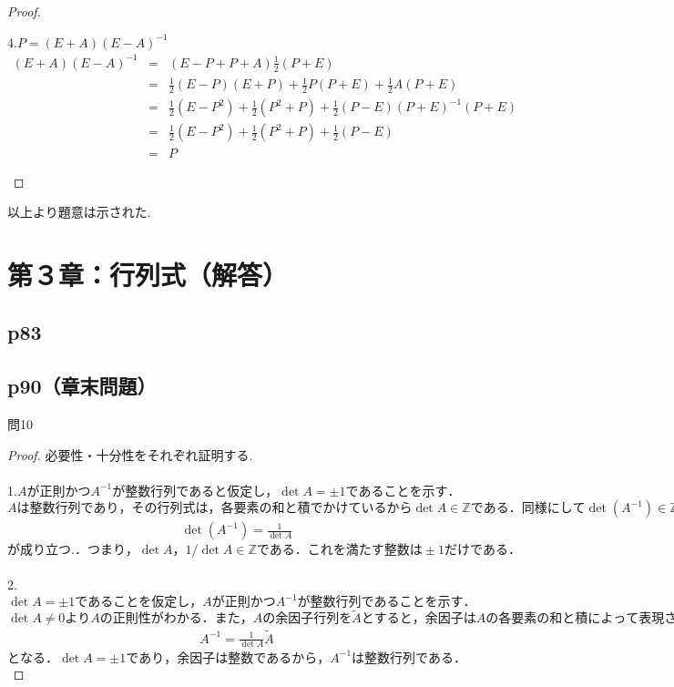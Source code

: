 \documentclass[dvipdfmx,uplatex,11pt]{jsarticle}
\theoremstyle{definition}
\begin{document}
\begin{proof}
%
%
%
\newpage
%
%
%
\begin{leftbar}
4.$P= (E + A)(E − A)^{−1}$
\begin{eqnarray*}
(E + A)(E − A)^{−1}&=&(E − P + P + A)\frac{1}{2}(P + E)\\
&=&\frac{1}{2}(E − P)(E + P)+\frac{1}{2}P(P + E)+\frac{1}{2}A(P + E)\\
&=&\frac{1}{2}(E − P^2) +\frac{1}{2}(P^2+P)+\frac{1}{2}(P − E)(P + E)^{−1}(P + E)\\
&=&\frac{1}{2}(E − P^2)+\frac{1}{2}(P^2+P)+\frac{1}{2}(P − E)\\
&=&P
\end{eqnarray*}
\end{leftbar}
\end{proof}
以上より題意は示された.
%
%
%
\newpage
%
%
%
\section{第３章：行列式（解答）}
\subsection{p83}
%
%
%
\newpage
%
%
%
\subsection{p90（章末問題）}
問10\\
\noindent
\begin{leftbar}
\begin{proof}
必要性・十分性をそれぞれ証明する.\\ \\
1.$Aが正則かつA^{−1}が整数行列であると仮定し，\det A=\pm 1であることを示す．$\\
$Aは整数行列であり，その行列式は，各要素の和と積でかけているから\det A \in \mathbb{Z}である．同様にして\det (A^{−1}) \in \mathbb{Z}である．逆行列の行列式は，$
\begin{eqnarray*}
\det (A^{−1})=\frac{1}{\det A}
\end{eqnarray*}
$が成り立つ.．つまり，\det A，1/\det A \in \mathbb{Z} である．これを満たす整数は\pm 1だけである．$\\
\\
2.$\det A=\pm 1であることを仮定し，Aが正則かつA^{−1}が整数行列であることを示す．$\\
$\det A \neq 0 より A の正則性がわかる．また，Aの余因子行列を\tilde{A}とすると，余因子はAの各要素の和と積によって表現される．つまり，余因子は整数であるから\tilde{A}は整数行列である. また$
\begin{eqnarray*}
A^{−1}=\frac{1}{\det A}\tilde{A}
\end{eqnarray*}
$となる．\det A=\pm 1であり， 余因子は整数であるから，A^{−1}は整数行列である．$
\end{proof}
\end{leftbar}
%
%
%
\newpage
%
%
%
\end{document}
